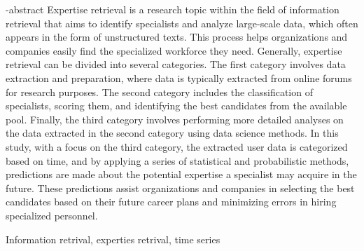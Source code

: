 \documentclass[oneside,openany,msc]{SBU-Thesis}
\begin{document}
\en-abstract
{
	Expertise retrieval is a research topic within the field of information retrieval that aims to identify specialists and analyze large-scale data, which often appears in the form of unstructured texts. This process helps organizations and companies easily find the specialized workforce they need. Generally, expertise retrieval can be divided into several categories. The first category involves data extraction and preparation, where data is typically extracted from online forums for research purposes. The second category includes the classification of specialists, scoring them, and identifying the best candidates from the available pool. Finally, the third category involves performing more detailed analyses on the data extracted in the second category using data science methods. In this study, with a focus on the third category, the extracted user data is categorized based on time, and by applying a series of statistical and probabilistic methods, predictions are made about the potential expertise a specialist may acquire in the future. These predictions assist organizations and companies in selecting the best candidates based on their future career plans and minimizing errors in hiring specialized personnel.
}

\latinkeywords
{
	Information retrival, experties retrival, time series
}

\latinAbstractPage %
\latinFirstPage %

	
\end{document}
